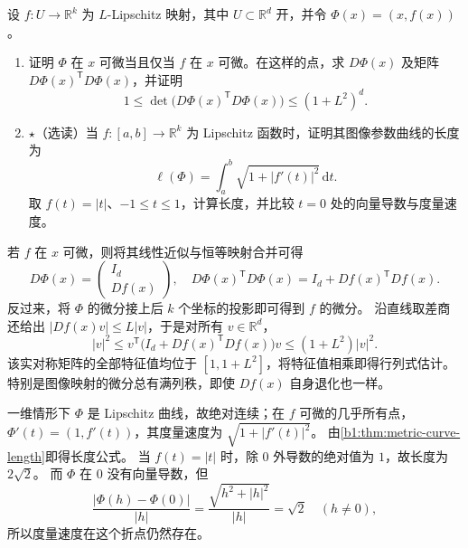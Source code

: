 \begin{exercise}\label{b1:ex:16-graph-differential}
设 \(f:U\to\mathbb R^k\) 为 \(L\)-Lipschitz 映射，其中 \(U\subset\mathbb R^d\) 开，并令 \(\Phi(x)=(x,f(x))\)。
\begin{enumerate}
\item\label{b1:item:16-graph-matrix}
证明 \(\Phi\) 在 \(x\) 可微当且仅当 \(f\) 在 \(x\) 可微。在这样的点，求 \(D\Phi(x)\) 及矩阵 \(D\Phi(x)^{\mathsf T}D\Phi(x)\)，并证明
\[
 1\le\det\bigl(D\Phi(x)^{\mathsf T}D\Phi(x)\bigr)
 \le(1+L^2)^d.
\]
\item\label{b1:item:16-graph-curve-length}
\(\star\)（选读）当 \(f:[a,b]\to\mathbb R^k\) 为 Lipschitz 函数时，证明其图像参数曲线的长度为
\[
 \ell(\Phi)
 =\int_a^b\sqrt{1+|f'(t)|^2}\,\mathrm dt.
\]
取 \(f(t)=|t|\)、\(-1\le t\le1\)，计算长度，并比较 \(t=0\) 处的向量导数与度量速度。
\end{enumerate}
\end{exercise}
\begin{solution}
若 \(f\) 在 \(x\) 可微，则将其线性近似与恒等映射合并可得
\[
 D\Phi(x)=\begin{pmatrix}I_d\\Df(x)\end{pmatrix},
 \quad
 D\Phi(x)^{\mathsf T}D\Phi(x)=I_d+Df(x)^{\mathsf T}Df(x).
\]
反过来，将 \(\Phi\) 的微分接上后 \(k\) 个坐标的投影即可得到 \(f\) 的微分。
沿直线取差商还给出 \(|Df(x)v|\le L|v|\)，于是对所有 \(v\in\mathbb R^d\)，
\[
 |v|^2\le v^{\mathsf T}\bigl(I_d+Df(x)^{\mathsf T}Df(x)\bigr)v
 \le(1+L^2)|v|^2.
\]
该实对称矩阵的全部特征值均位于 \([1,1+L^2]\)，将特征值相乘即得行列式估计。
特别是图像映射的微分总有满列秩，即使 \(Df(x)\) 自身退化也一样。

一维情形下 \(\Phi\) 是 Lipschitz 曲线，故绝对连续；在 \(f\) 可微的几乎所有点，
\(\Phi'(t)=(1,f'(t))\)，其度量速度为 \(\sqrt{1+|f'(t)|^2}\)。
由\cref{b1:thm:metric-curve-length}即得长度公式。
当 \(f(t)=|t|\) 时，除 \(0\) 外导数的绝对值为 \(1\)，故长度为 \(2\sqrt2\)。
而 \(\Phi\) 在 \(0\) 没有向量导数，但
\[
 \frac{|\Phi(h)-\Phi(0)|}{|h|}
 =\frac{\sqrt{h^2+|h|^2}}{|h|}=\sqrt2
 \quad(h\ne0),
\]
所以度量速度在这个折点仍然存在。
\end{solution}

